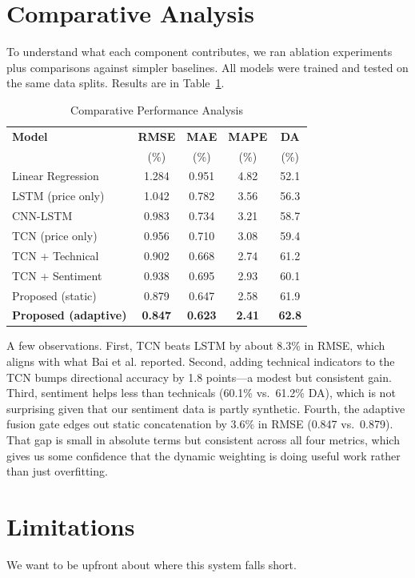 \documentclass[conference]{IEEEtran}
\begin{document}
\section{Comparative Analysis}
To understand what each component contributes, we ran ablation experiments plus comparisons against simpler baselines. All models were trained and tested on the same data splits. Results are in Table~\ref{tab:comparison}.

\begin{table}[htbp]
\caption{Comparative Performance Analysis}
\label{tab:comparison}
\centering
\small
\begin{tabular}{lcccc}
\toprule
\textbf{Model} & \textbf{RMSE} & \textbf{MAE} & \textbf{MAPE} & \textbf{DA} \\
 & (\%) & (\%) & (\%) & (\%) \\
\midrule
Linear Regression & 1.284 & 0.951 & 4.82 & 52.1 \\
LSTM (price only) & 1.042 & 0.782 & 3.56 & 56.3 \\
CNN-LSTM & 0.983 & 0.734 & 3.21 & 58.7 \\
TCN (price only) & 0.956 & 0.710 & 3.08 & 59.4 \\
TCN + Technical & 0.902 & 0.668 & 2.74 & 61.2 \\
TCN + Sentiment & 0.938 & 0.695 & 2.93 & 60.1 \\
Proposed (static) & 0.879 & 0.647 & 2.58 & 61.9 \\
\textbf{Proposed (adaptive)} & \textbf{0.847} & \textbf{0.623} & \textbf{2.41} & \textbf{62.8} \\
\bottomrule
\end{tabular}
\end{table}

A few observations. First, TCN beats LSTM by about 8.3\% in RMSE, which aligns with what Bai et al. \cite{bai2018} reported. Second, adding technical indicators to the TCN bumps directional accuracy by 1.8 points---a modest but consistent gain. Third, sentiment helps less than technicals (60.1\% vs.\ 61.2\% DA), which is not surprising given that our sentiment data is partly synthetic. Fourth, the adaptive fusion gate edges out static concatenation by 3.6\% in RMSE (0.847 vs.\ 0.879). That gap is small in absolute terms but consistent across all four metrics, which gives us some confidence that the dynamic weighting is doing useful work rather than just overfitting.

\section{Limitations}
We want to be upfront about where this system falls short.
\end{document}
